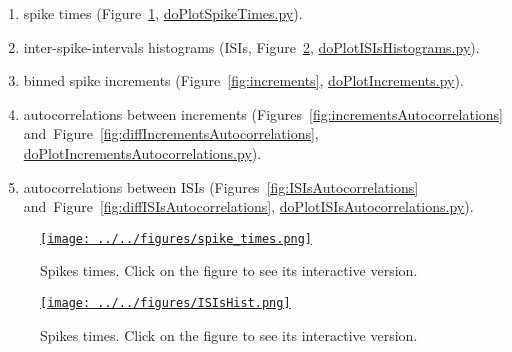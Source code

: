 \documentclass[10pt]{article}
\begin{document}
\begin{enumerate}

    \item spike times (Figure~\ref{fig:spikesTimes},
\href{https://github.com/joacorapela/singleNeuronSpikesAnalysisTutorial/blob/master/code/scripts/doPlotSpikeTimes.py}{doPlotSpikeTimes.py}).

    \item inter-spike-intervals histograms (ISIs, Figure~\ref{fig:ISIsHist},
\href{https://github.com/joacorapela/singleNeuronSpikesAnalysisTutorial/blob/master/code/scripts/doPlotISIsHistograms.py}{doPlotISIsHistograms.py}). 

    \item binned spike increments (Figure~\ref{fig:increments},
\href{https://github.com/joacorapela/singleNeuronSpikesAnalysisTutorial/blob/master/code/scripts/doPlotIncrements.py}{doPlotIncrements.py}).

    \item autocorrelations between increments (Figures~\ref{fig:incrementsAutocorrelations} and~Figure~\ref{fig:diffIncrementsAutocorrelations}, \href{https://github.com/joacorapela/singleNeuronSpikesAnalysisTutorial/blob/master/code/scripts/doPlotIncrementsAutocorrelations.py}{doPlotIncrementsAutocorrelations.py}).

    \item autocorrelations between ISIs (Figures~\ref{fig:ISIsAutocorrelations} and~Figure~\ref{fig:diffISIsAutocorrelations}, \href{https://github.com/joacorapela/singleNeuronSpikesAnalysisTutorial/blob/master/code/scripts/doPlotISIsAutocorrelations.py}{doPlotISIsAutocorrelations.py}).

\end{enumerate}

\begin{figure}
    \href{http://www.gatsby.ucl.ac.uk/~rapela/singleNeuronSpikesAnalysisTutorial/figures/spike_times.html}{\texttt{[image: ../../figures/spike\_times.png]}}
    \caption{Spikes times. Click on the figure to see its interactive version.}
    \label{fig:spikesTimes}
\end{figure}

\begin{figure}
    \href{http://www.gatsby.ucl.ac.uk/~rapela/singleNeuronSpikesAnalysisTutorial/figures/ISIsHist.html}{\texttt{[image: ../../figures/ISIsHist.png]}}
    \caption{Spikes times. Click on the figure to see its interactive version.}
    \label{fig:ISIsHist}
\end{figure}
\end{document}
